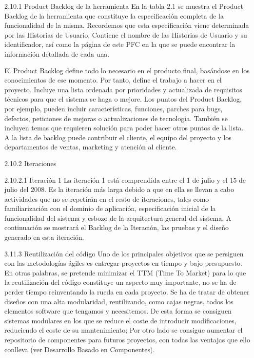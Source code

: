 2.10.1 Product Backlog de la herramienta 
En  la  tabla  2.1  se  muestra  el  Product  Backlog  de  la  herramienta  que  constituye  la especificación completa de la funcionalidad de la misma. Recordemos que esta especificación viene determinada por las Historias de Usuario. 
Contiene el nombre de las Historias de Usuario y su identificador, así como la página de este PFC en la que se puede encontrar la información detallada de cada una.  

El Product Backlog define todo lo necesario en el producto final, basándose en los conocimientos de ese momento. Por tanto, define el trabajo a hacer en el proyecto. Incluye una lista ordenada por prioridades y actualizada de requisitos técnicos para que el sistema se haga o mejore. Los puntos del Product Backlog, por ejemplo, pueden incluir características, funciones, parches para bugs, defectos, peticiones de mejoras o actualizaciones de tecnología.
También se incluyen temas que requieren solución para poder hacer otros puntos de la lista. A la lista de backlog puede contribuir el cliente, el equipo del proyecto y los departamentos de ventas, marketing y atención al cliente.


2.10.2 Iteraciones 


2.10.2.1 Iteración 1 
La  iteración  1  está  comprendida  entre  el  1  de  julio  y  el  15  de  julio  del  2008.  Es  la iteración más larga debido a que en ella se llevan a cabo actividades que no se repetirán en el resto  de  iteraciones,  tales  como  familiarización  con  el  dominio  de  aplicación,  especificación inicial de la funcionalidad del sistema y esbozo de la arquitectura general del sistema. A continuación se mostrará el Backlog de la Iteración, las pruebas y el diseño generado en esta iteración. 




3.11.3 Reutilización del código 
Uno  de  los  principales  objetivos  que  se  persiguen  con  las  metodologías  ágiles  es  entregar  proyectos  en  tiempo  y  bajo  presupuesto.  En  otras  palabras,  se  pretende  minimizar  el  TTM (Time To Market) para lo que la reutilización del código constituye un aspecto muy importante, no  se  ha  de  perder  tiempo  reinventando  la  rueda  en  cada  proyecto.    Se  ha  de  tratar  de obtener  diseños  con  una  alta  modularidad,  reutilizando,  como  cajas  negras,  todos  los elementos  software  que  tengamos  y  necesitemos.  De  esta  forma  se  consiguen  sistemas  modulares en los que se reduce el coste de introducir modificaciones, reduciendo el coste de su mantenimiento;  Por  otro  lado  se  consigue  aumentar  el  repositorio  de  componentes  para futuros  proyectos,  con  todas  las  ventajas  que  ello  conlleva  (ver  Desarrollo  Basado  en Componentes). 

